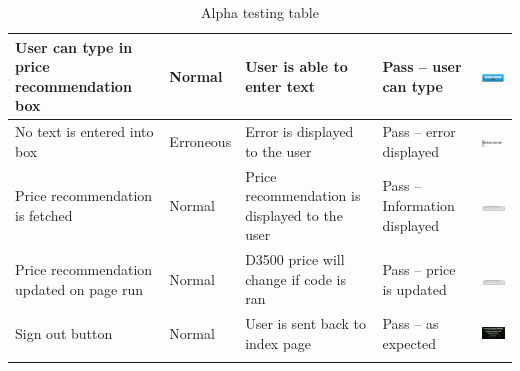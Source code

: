 \begin{center}
\begin{longtable}{|P{23mm}|P{20mm}|P{19mm}|P{20mm}|P{54mm}|}
User can type in price recommendation box & Normal & User is able to
enter text & Pass -- user can type &
\includegraphics[width=51mm]{ch4_testing_for_eval/media/image42.png} \\ \hline
No text is entered into box & Erroneous & Error is displayed to the user
& Pass -- error displayed &
\includegraphics[width=51mm]{ch4_testing_for_eval/media/image43.png} \\ \hline
Price recommendation is fetched & Normal & Price recommendation is
displayed to the user & Pass -- Information displayed &
\includegraphics[width=51mm]{ch4_testing_for_eval/media/image44.png} \\ \hline
Price recommendation updated on page run & Normal & D3500 price will
change if code is ran & Pass -- price is updated &
\includegraphics[width=51mm]{ch4_testing_for_eval/media/image45.png} \\ \hline
Sign out button & Normal & User is sent back to index page & Pass -- as
expected &
\includegraphics[width=51mm]{ch4_testing_for_eval/media/image46.png} \\ \hline

    \caption{Alpha testing table}
\label{tab:alpha_testing}
\end{longtable}
\end{center}